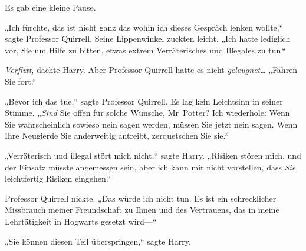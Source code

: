 Es gab eine kleine Pause.

„Ich fürchte, das ist nicht ganz das wohin ich dieses Gespräch lenken wollte,“ sagte Professor Quirrell. Seine Lippenwinkel zuckten leicht. „Ich hatte lediglich vor, Sie um Hilfe zu bitten, etwas extrem Verräterisches und Illegales zu tun.“

\emph{Verflixt}, dachte Harry. Aber Professor Quirrell hatte es nicht \emph{geleugnet}… „Fahren Sie fort.“

„Bevor ich das tue,“ sagte Professor Quirrell. Es lag kein Leichtsinn in seiner Stimme. „\emph{Sind} Sie offen für solche Wünsche, Mr~Potter? Ich wiederhole: Wenn Sie wahrscheinlich sowieso nein sagen werden, müssen Sie jetzt nein sagen. Wenn Ihre Neugierde Sie anderweitig antreibt, zerquetschen Sie sie.“

„Verräterisch und illegal stört mich nicht,“ sagte Harry. „Risiken stören mich, und der Einsatz müsste angemessen sein, aber ich kann mir nicht vorstellen, dass \emph{Sie} leichtfertig Risiken eingehen.“

Professor Quirrell nickte. „Das würde ich nicht tun. Es ist ein schrecklicher Missbrauch meiner Freundschaft zu Ihnen und des Vertrauens, das in meine Lehrtätigkeit in Hogwarts gesetzt wird—“

„Sie können diesen Teil überspringen,“ sagte Harry.

